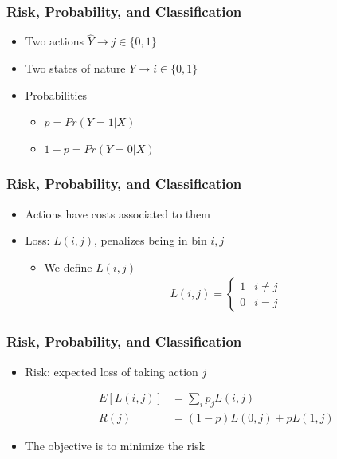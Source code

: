 \documentclass[
  shownotes,
  xcolor={svgnames},
  hyperref={colorlinks,citecolor=DarkBlue,linkcolor=andesred,urlcolor=DarkBlue}
  , aspectratio=169]{beamer}
\begin{document}
\begin{frame}[fragile]
\frametitle{Risk, Probability, and Classification}

\begin{itemize}
  \item Two actions $\hat{Y} \rightarrow j\in \{0,1\}$
  \medskip
  \item Two states of nature $Y \rightarrow i\in\{0,1\}$
  \medskip
  
  \item Probabilities
  \medskip
  \begin{itemize}
    \item $p=Pr(Y=1|X)$
    \medskip
    \item $1-p=Pr(Y=0|X)$
  \end{itemize}
  \end{itemize}

\end{frame}
\begin{frame}[fragile]
\frametitle{Risk, Probability, and Classification}

\begin{itemize}
  \item Actions have costs associated to them

  \medskip
  \item Loss: $L(i,j)$, penalizes being in bin $i,j$
\begin{itemize}
  
  \medskip
  \item We define $L(i,j)$
  \medskip
        \begin{align}
        L(i,j)=\begin{cases}
                  1 & i\neq j\\
                  0 & i=j
                \end{cases}
        \end{align}
\end{itemize}
\end{itemize}

  \end{frame}
\begin{frame}[fragile]
\frametitle{Risk, Probability, and Classification}
\begin{itemize}
  \item Risk: expected loss of taking action $j$
  
  \medskip

\begin{align}
E[L(i,j)] &= \sum_i p_j L(i,j) \\ \nonumber
R(j) &= (1-p) L(0,j) + p L(1,j)
\end{align}

\medskip
  \item The objective is to minimize the risk
\end{itemize}





\end{frame}
\end{document}
